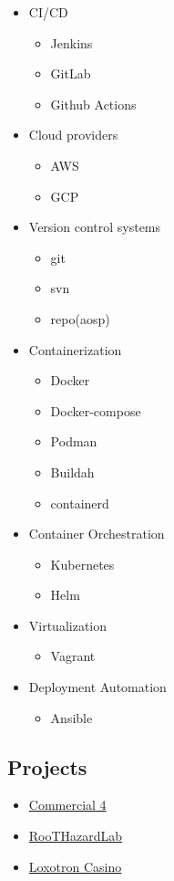 \begin{itemize}
    \item CI/CD
    \begin{itemize}
        \item Jenkins
        \item GitLab
        \item Github Actions
    \end{itemize}

    \item Cloud providers
    \begin{itemize}
        \item AWS
        \item GCP
    \end{itemize}

    \item Version control systems
    \begin{itemize}
        \item git
        \item svn
        \item repo(aosp)
    \end{itemize}

    \item Containerization
    \begin{itemize}
        \item Docker
        \item Docker-compose
        \item Podman
        \item Buildah
        \item containerd
    \end{itemize}

    \item Container Orchestration
    \begin{itemize}
        \item Kubernetes
        \item Helm
    \end{itemize}

    \item Virtualization
    \begin{itemize}
        \item Vagrant
    \end{itemize}

    \item Deployment Automation
    \begin{itemize}
        \item Ansible
    \end{itemize}
\end{itemize}

\subsection{Projects}

\begin{itemize}
    \item \hyperlink{proj_com4}{Commercial 4}
    \item \hyperlink{proj_rhl}{RooTHazardLab}
    \item \hyperlink{proj_loxotron}{Loxotron Casino}
\end{itemize}

\newpage
